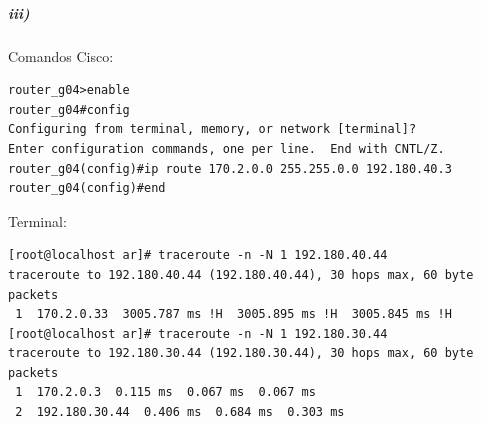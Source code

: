 \subparagraph{iii)}
Comandos Cisco:
\begin{verbatim}                                                         
router_g04>enable                                                        
router_g04#config                                                        
Configuring from terminal, memory, or network [terminal]?                
Enter configuration commands, one per line.  End with CNTL/Z.            
router_g04(config)#ip route 170.2.0.0 255.255.0.0 192.180.40.3           
router_g04(config)#end                                                   
\end{verbatim}                                                          
Terminal:
\begin{verbatim}
[root@localhost ar]# traceroute -n -N 1 192.180.40.44                    
traceroute to 192.180.40.44 (192.180.40.44), 30 hops max, 60 byte packets
 1  170.2.0.33  3005.787 ms !H  3005.895 ms !H  3005.845 ms !H           
[root@localhost ar]# traceroute -n -N 1 192.180.30.44                    
traceroute to 192.180.30.44 (192.180.30.44), 30 hops max, 60 byte packets
 1  170.2.0.3  0.115 ms  0.067 ms  0.067 ms                              
 2  192.180.30.44  0.406 ms  0.684 ms  0.303 ms                                                                             
\end{verbatim}

